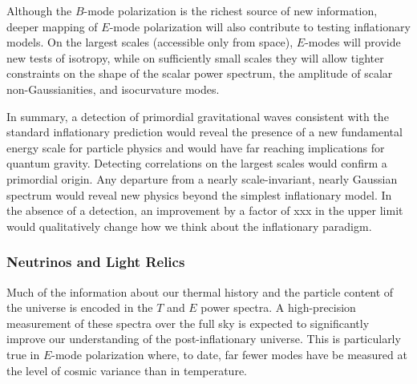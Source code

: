 Although the $B$-mode polarization is the richest source of new information, deeper mapping of $E$-mode polarization will also contribute to testing inflationary models. On the largest scales (accessible only from space), $E$-modes will provide new tests of isotropy, while on sufficiently small scales they will allow tighter constraints on the shape of the scalar power spectrum, the amplitude of scalar non-Gaussianities, and isocurvature modes.  

In summary, a detection of primordial gravitational waves consistent with the standard inflationary prediction would reveal the presence of a new fundamental energy scale for particle physics and would have far reaching implications for quantum gravity. Detecting correlations on the largest scales would confirm a primordial origin. Any departure from a nearly scale-invariant, nearly Gaussian spectrum would reveal new physics beyond the simplest inflationary model. In the absence of a detection, an improvement by a factor of xxx in the upper limit would qualitatively change how we think about the inflationary paradigm.

\vspace{-0.15in}

\subsubsection{Neutrinos and Light Relics}

\vspace{-0.05in}

Much of the information about our thermal history and the particle content of the universe is encoded in the $T$ and $E$ power spectra.  
A high-precision measurement of these spectra over the full sky is expected to significantly improve our understanding of the post-inflationary 
universe.  This is particularly true in $E$-mode polarization where, to date, far fewer modes have be measured at the level of cosmic variance than in temperature.

